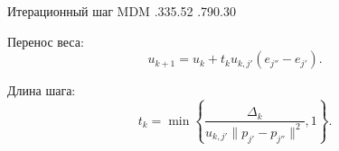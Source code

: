 \SPBGSplitSlide
  {Итерационный шаг MDM}
  {.335}{.52}
  {%
    \ReportMdmStep
  }
  {.790}{.30}
  {%
    \SplitBody
    Перенос веса:
    \[
      u_{k+1}
      =u_k+t_k u_{k,j'}(e_{j''}-e_{j'}).
    \]

    Длина шага:
    \[
      t_k=\min\left\{
        \frac{\Delta_k}{
          u_{k,j'}\|p_{j'}-p_{j''}\|^2},
        1
      \right\}.
    \]
  }
